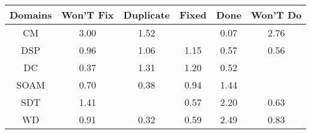 \begin{tabular}{|c||c|c|c|c|c|}
\hline
Domains & Won'T Fix & Duplicate & Fixed & Done & Won'T Do \\ 
\hline
CM & \cellcolor[rgb]{0.53,0.66,0.42} 3.00 & \cellcolor[rgb]{0.8108934921751874,0.7930548120829835,0.42} 1.52 &  & \cellcolor[rgb]{0.76,0.13,0.28} 0.07 & \cellcolor[rgb]{0.5744895170074209,0.6810739817403573,0.41999999999999993} 2.76 \\ 
\hline
DSP & \cellcolor[rgb]{0.9031114413494727,0.8073941557208373,0.41357067859284113} 0.96 & \cellcolor[rgb]{0.8979135551507552,0.8342748419135155,0.42} 1.06 & \cellcolor[rgb]{0.8814715588109068,0.8264865278577979,0.42} 1.15 & \cellcolor[rgb]{0.8411142982063264,0.5139410115099446,0.35570667832590463} 0.57 & \cellcolor[rgb]{0.8393764824899446,0.5057153504524043,0.35408471699061494} 0.56 \\ 
\hline
DC & \cellcolor[rgb]{0.8080175290825502,0.35728297099073736,0.3248163604770468} 0.37 & \cellcolor[rgb]{0.8519950176619024,0.8125239557345855,0.42000000000000004} 1.31 & \cellcolor[rgb]{0.8726787368491258,0.8223215069285332,0.42} 1.20 & \cellcolor[rgb]{0.8323097557485348,0.4722661772097316,0.3474891053652992} 0.52 &  \\ 
\hline
SOAM & \cellcolor[rgb]{0.862105966757351,0.6133015759847944,0.37529890230686086} 0.70 & \cellcolor[rgb]{0.8104865878261147,0.3689698490436097,0.32712081530437376} 0.38 & \cellcolor[rgb]{0.9010589744861097,0.7976791459009195,0.4116550428537024} 0.94 & \cellcolor[rgb]{0.8256226257454974,0.8000317700899724,0.42} 1.44 &  \\ 
\hline
SDT & \cellcolor[rgb]{0.8314500128214504,0.8027921113364764,0.42} 1.41 &  & \cellcolor[rgb]{0.8410636249179273,0.5137011579448557,0.3556593832567321} 0.57 & \cellcolor[rgb]{0.6814325730562534,0.73173121881612,0.42000000000000004} 2.20 & \cellcolor[rgb]{0.8505697411571129,0.5586967748103344,0.36453175841330543} 0.63 \\ 
\hline
WD & \cellcolor[rgb]{0.8946621370202037,0.7674007818956308,0.40568466121885677} 0.91 & \cellcolor[rgb]{0.8004578558246649,0.32150051757008047,0.31776066543635395} 0.32 & \cellcolor[rgb]{0.8443221273929116,0.529124736326448,0.3587006522333841} 0.59 & \cellcolor[rgb]{0.6269835312365815,0.7059395674278544,0.42} 2.49 & \cellcolor[rgb]{0.8829163842735847,0.7118042188949671,0.39472195865534565} 0.83 \\ 
\hline
\end{tabular}